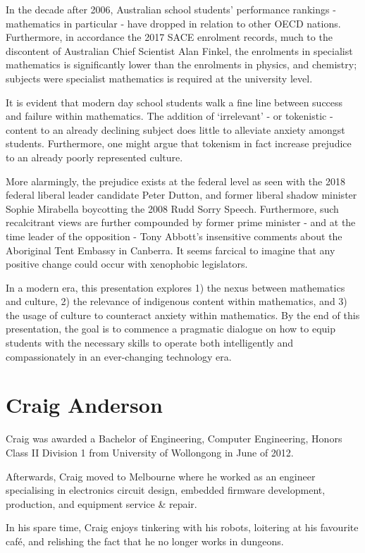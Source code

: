\documentclass[twoside,14pt,a4paper,notitlepage]{memoir}
\begin{document}
In the decade after 2006, Australian school students’ performance rankings - mathematics in particular - have dropped in relation to other OECD nations. Furthermore, in accordance the 2017 SACE enrolment records, much to the discontent of Australian Chief Scientist Alan Finkel, the enrolments in specialist mathematics is significantly lower than the enrolments in physics, and chemistry; subjects were specialist mathematics is required at the university level.
 
It is evident that modern day school students walk a fine line between success and failure within mathematics. The addition of ‘irrelevant’ - or tokenistic - content to an already declining subject does little to alleviate anxiety amongst students. Furthermore, one might argue that tokenism in fact increase prejudice to an already poorly represented culture.
 
More alarmingly, the prejudice exists at the federal level as seen with the 2018 federal liberal leader candidate Peter Dutton, and former liberal shadow minister Sophie Mirabella boycotting the 2008 Rudd Sorry Speech. Furthermore, such recalcitrant views are further compounded by former prime minister - and at the time leader of the opposition - Tony Abbott’s insensitive comments about the Aboriginal Tent Embassy in Canberra. It seems farcical to imagine that any positive change could occur with xenophobic legislators.
 
In a modern era, this presentation explores 1) the nexus between mathematics and culture, 2) the relevance of indigenous content within mathematics, and 3) the usage of culture to counteract anxiety within mathematics. By the end of this presentation, the goal is to commence a pragmatic dialogue on how to equip students with the necessary skills to operate both intelligently and compassionately in an ever-changing technology era.

\section*{Craig Anderson}

Craig was awarded a Bachelor of Engineering, Computer Engineering, Honors Class II Division 1 from University of Wollongong in June of 2012.

Afterwards, Craig moved to Melbourne where he worked as an engineer specialising in electronics circuit design, embedded firmware development, production, and equipment service \& repair.

In his spare time, Craig enjoys tinkering with his robots, loitering at his favourite café, and relishing the fact that he no longer works in dungeons.
\end{document}
